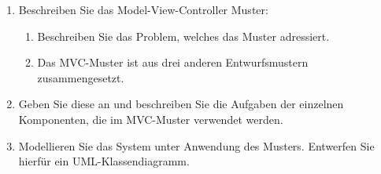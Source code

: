 \documentclass{lehramt-informatik}
\begin{document}
\begin{enumerate}


\item Beschreiben Sie das Model-View-Controller Muster:

\begin{enumerate}


\item Beschreiben Sie das Problem, welches das Muster adressiert.


\item Das MVC-Muster ist aus drei anderen Entwurfsmustern
zusammengesetzt.
\end{enumerate}

\item Geben Sie diese an und beschreiben Sie die Aufgaben der einzelnen
Komponenten, die im MVC-Muster verwendet werden.


\item Modellieren Sie das System unter Anwendung des Musters. Entwerfen
Sie hierfür ein UML-Klassendiagramm.

\end{enumerate}

\literatur
\end{document}
